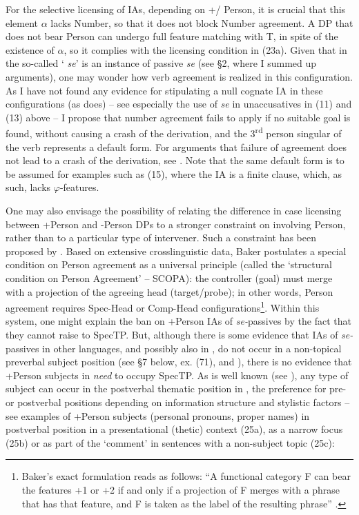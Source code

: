 \documentclass[output=paper]{langsci/langscibook}
\begin{document}
For the selective licensing of IAs, depending on +/\textminus{} Person, it is crucial that this element $\alpha $ lacks Number, so that it does not block Number agreement. A DP that does not bear Person can undergo full feature matching with T, in spite of the existence of $\alpha $, so it complies with the licensing condition in (23a). Given that in  the so-called ‘ \textit{se}' is an instance of passive \textit{se} (see §2, where I summed up  arguments), one may wonder how verb agreement is realized in this configuration. As I have not found any evidence for stipulating a null cognate IA in these configurations (as \citealt{Dobrovie-Sorin1998} does) – see especially the use of  \textit{se} in unaccusatives in (11) and (13) above – I propose that number agreement fails to apply if no suitable goal is found, without causing a crash of the derivation, and the 3\textsuperscript{rd} person singular of the verb represents a default form. For arguments that failure of agreement does not lead to a crash of the derivation, see \citet{Preminger2014}. Note that the same default form is to be assumed for examples such as (15), where the IA is a finite clause, which, as such, lacks $\varphi $-features.

One may also envisage the possibility of relating the difference in case licensing between +Person and -Person DPs to a stronger constraint on  involving Person, rather than to a particular type of intervener. Such a constraint has been proposed by \citet{Baker2008}. Based on extensive crosslinguistic data, Baker postulates a special condition on Person agreement as a universal principle (called the ‘structural condition on Person Agreement' – SCOPA): the controller (goal) must merge with a projection of the agreeing head (target\slash probe); in other words, Person agreement requires Spec-Head or Comp-Head configurations\footnote{Baker’s exact formulation reads as follows: “A functional category F can bear the features +1 or +2 if and only if a projection of F merges with a phrase that has that feature, and F is taken as the label of the resulting phrase” \citep[52]{Baker2008}.}. Within this system, one might explain the ban on +Person IAs of \textit{se-}passives by the fact that they cannot raise to SpecTP. But, although there is some evidence that IAs of \textit{se-}passives in other  languages, and possibly also in , do not occur in a non-topical preverbal subject position (see §7 below, ex. (71), and \citealt{Raposo1996,Cornilescu1998,Dobrovie-Sorin2006}), there is no evidence that +Person subjects in  \textit{need} to occupy SpecTP. As is well known (see \citealt{Dobrovie-Sorin1987,Dobrovie-Sorin1994,Cornilescu1997,Alboiu2002}), any type of subject can occur in the postverbal thematic position in , the preference for pre- or postverbal positions depending on information structure and stylistic factors – see examples of +Person subjects (personal pronouns, proper names) in postverbal position in a presentational (thetic) context (25a), as a narrow focus (25b) or as part of the ‘comment' in sentences with a non-subject topic (25c):
\end{document}
